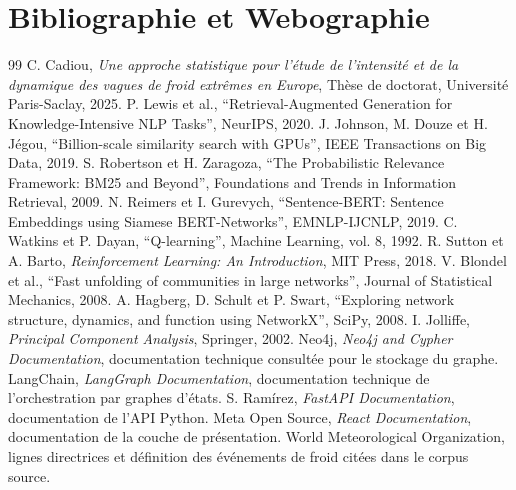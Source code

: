 \documentclass[12pt,a4paper,oneside]{report}
\begin{document}
\clearpage
\chapter*{Bibliographie et Webographie}
\begin{thebibliography}{99}
 C. Cadiou, \textit{Une approche statistique pour l'étude de l'intensité et de la dynamique des vagues de froid extrêmes en Europe}, Thèse de doctorat, Université Paris-Saclay, 2025.
 P. Lewis et al., ``Retrieval-Augmented Generation for Knowledge-Intensive NLP Tasks'', NeurIPS, 2020.
 J. Johnson, M. Douze et H. Jégou, ``Billion-scale similarity search with GPUs'', IEEE Transactions on Big Data, 2019.
 S. Robertson et H. Zaragoza, ``The Probabilistic Relevance Framework: BM25 and Beyond'', Foundations and Trends in Information Retrieval, 2009.
 N. Reimers et I. Gurevych, ``Sentence-BERT: Sentence Embeddings using Siamese BERT-Networks'', EMNLP-IJCNLP, 2019.
 C. Watkins et P. Dayan, ``Q-learning'', Machine Learning, vol. 8, 1992.
 R. Sutton et A. Barto, \textit{Reinforcement Learning: An Introduction}, MIT Press, 2018.
 V. Blondel et al., ``Fast unfolding of communities in large networks'', Journal of Statistical Mechanics, 2008.
 A. Hagberg, D. Schult et P. Swart, ``Exploring network structure, dynamics, and function using NetworkX'', SciPy, 2008.
 I. Jolliffe, \textit{Principal Component Analysis}, Springer, 2002.
 Neo4j, \textit{Neo4j and Cypher Documentation}, documentation technique consultée pour le stockage du graphe.
 LangChain, \textit{LangGraph Documentation}, documentation technique de l'orchestration par graphes d'états.
 S. Ramírez, \textit{FastAPI Documentation}, documentation de l'API Python.
 Meta Open Source, \textit{React Documentation}, documentation de la couche de présentation.
 World Meteorological Organization, lignes directrices et définition des événements de froid citées dans le corpus source.
\end{thebibliography}
\end{document}
